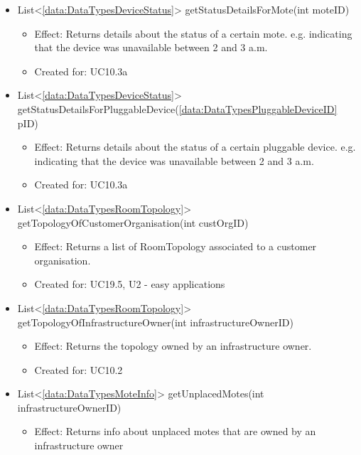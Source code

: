 \begin{description}
\begin{itemize}[noitemsep,nolistsep,leftmargin=-.25cm]
      \item \textsf{List\textless{}\ref{data:DataTypesDeviceStatus}\textgreater{} getStatusDetailsForMote(int moteID)}
        \begin{itemize}[noitemsep,nolistsep]
           \item Effect: Returns details about the status of a certain mote. e.g. indicating that the device was unavailable between 2 and 3 a.m.
\item Created for: UC10.3a
        \end{itemize}
      \item \textsf{List\textless{}\ref{data:DataTypesDeviceStatus}\textgreater{} getStatusDetailsForPluggableDevice(\ref{data:DataTypesPluggableDeviceID} pID)}
        \begin{itemize}[noitemsep,nolistsep]
           \item Effect: Returns details about the status of a certain pluggable device. e.g. indicating that the device was unavailable between 2 and 3 a.m.
\item Created for: UC10.3a
        \end{itemize}
      \item \textsf{List\textless{}\ref{data:DataTypesRoomTopology}\textgreater{} getTopologyOfCustomerOrganisation(int custOrgID)}
        \begin{itemize}[noitemsep,nolistsep]
           \item Effect: Returns a list of RoomTopology associated to a customer organisation.
\item Created for: UC19.5, U2 - easy applications
        \end{itemize}
      \item \textsf{List\textless{}\ref{data:DataTypesRoomTopology}\textgreater{} getTopologyOfInfrastructureOwner(int infrastructureOwnerID)}
        \begin{itemize}[noitemsep,nolistsep]
           \item Effect: Returns the topology owned by an infrastructure owner.
\item Created for: UC10.2
        \end{itemize}
      \item \textsf{List\textless{}\ref{data:DataTypesMoteInfo}\textgreater{} getUnplacedMotes(int infrastructureOwnerID)}
        \begin{itemize}[noitemsep,nolistsep]
           \item Effect: Returns info about unplaced motes that are owned by an infrastructure owner

\end{itemize}
\end{itemize}
\end{description}
